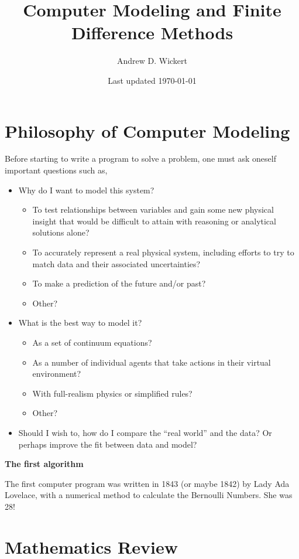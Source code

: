 \documentclass[a4paper,10pt]{scrartcl}
\title{Computer Modeling and Finite Difference Methods}
\author{Andrew D. Wickert}
\date{Last updated \today}
\begin{document}
\maketitle

\section{Philosophy of Computer Modeling}

Before starting to write a program to solve a problem, one must ask oneself important questions such as,
\begin{itemize}
 \item Why do I want to model this system?
 \begin{itemize}
  \item To test relationships between variables and gain some new physical insight that would be difficult to attain with reasoning or analytical solutions alone?
  \item To accurately represent a real physical system, including efforts to try to match data and their associated uncertainties?
  \item To make a prediction of the future and/or past?
  \item Other?
 \end{itemize}
 \item What is the best way to model it?
 \begin{itemize}
  \item As a set of continuum equations?
  \item As a number of individual agents that take actions in their virtual environment?
  \item With full-realism physics or simplified rules?
  \item Other?
 \end{itemize}
 \item Should I wish to, how do I compare the ``real world'' and the data? Or perhaps improve the fit between data and model?
\end{itemize}

\begin{framed}
\noindent\textbf{The first algorithm}

The first computer program was written in 1843 (or maybe 1842) by Lady Ada Lovelace, with a numerical method to calculate the Bernoulli Numbers. She was 28!
\end{framed}

\section{Mathematics Review}
\end{document}
